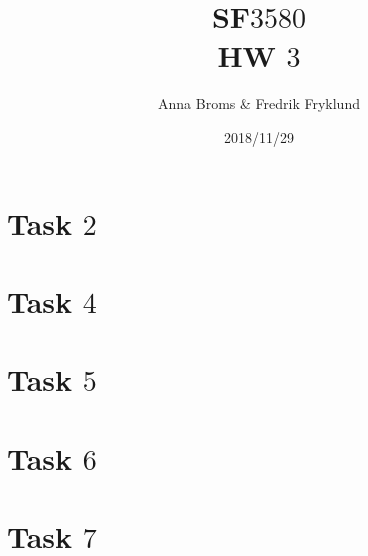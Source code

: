 \documentclass[a4paper]{article}
\title{SF$3580$\\HW $3$}
\author{Anna Broms \& Fredrik Fryklund}
\date{2018/11/29}
\begin{document}
\maketitle

 \section*{Task $2$}
 \section*{Task $4$}
 \section*{Task $5$}
 
 \section*{Task $6$}
 
\section*{Task $7$}

\end{document}
